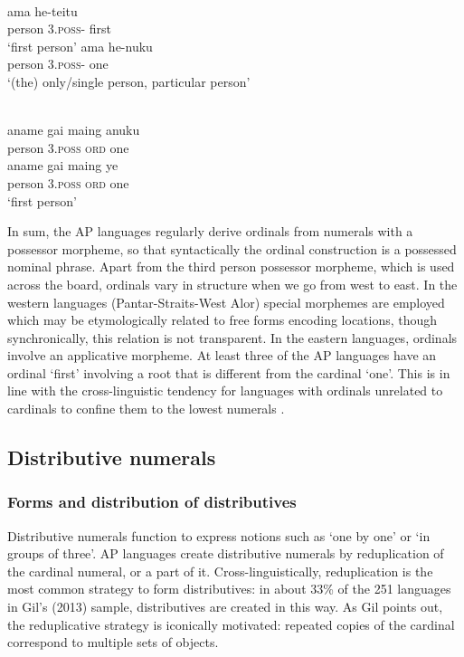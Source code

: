 \documentclass[output=paper]{LSP/langsci}
\begin{document}
\ea%
\label{bkm:Ref342651068}
\\
\ea
\gll ama     he-teitu\\  
    person    3\textsc{.poss-}  first  \\
\glt`first person'
\ex
\gll ama     he-nuku\\  
  person    3\textsc{.poss- } one  \\
\glt `(the) only/single person,  particular person'
\z\z

 


\ea%
\label{bkm:Ref342651067}
\\
 
\ea
\gll aname    gai  maing   anuku\\  
     person    3\textsc{.poss   ord } one\\ 
\ex
\gll aname    gai  maing   ye\\
    person    3\textsc{.poss   ord } one\\
\glt `first person'
\z\z
 

      

In sum, the AP languages regularly derive ordinals from numerals with a possessor morpheme, so that syntactically the ordinal construction is a possessed nominal phrase. Apart from the third person possessor morpheme, which is used across the board, ordinals vary in structure when we go from west to east. In the western languages (Pantar-Straits-West Alor) special morphemes are employed which may be etymologically related to free forms encoding locations, though synchronically, this relation is not transparent. In the eastern languages, ordinals involve an applicative morpheme. At least three of the AP languages have an ordinal `first' involving a root that is different from the cardinal `one'. This is in line with the cross-linguistic tendency for languages with ordinals unrelated to cardinals to confine them to the lowest numerals \citep{StolzEtAl2013}.

\subsection{Distributive numerals}
\label{sec:8:Distributive}
\subsubsection{Forms and distribution of distributives}
Distributive numerals function to express notions such as `one by one' or `in groups of three'. AP languages create distributive numerals by reduplication of the cardinal numeral, or a part of it. Cross-linguistically, reduplication is the most common strategy to form distributives: in about 33\% of the 251 languages in Gil's (2013) \nocite{Gil2013} sample, distributives are created in this way. As Gil points out, the reduplicative strategy is iconically motivated: repeated copies of the cardinal correspond to multiple sets of objects.
\end{document}
